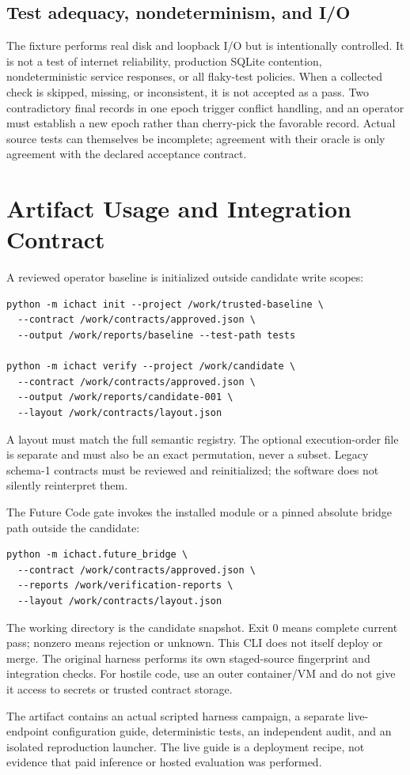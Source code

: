 \subsection{Test adequacy, nondeterminism, and I/O}
The fixture performs real disk and loopback I/O but is intentionally controlled. It is not a test of internet reliability, production SQLite contention, nondeterministic service responses, or all flaky-test policies. When a collected check is skipped, missing, or inconsistent, it is not accepted as a pass. Two contradictory final records in one epoch trigger conflict handling, and an operator must establish a new epoch rather than cherry-pick the favorable record. Actual source tests can themselves be incomplete; agreement with their oracle is only agreement with the declared acceptance contract.

\clearpage
\section{Artifact Usage and Integration Contract}
A reviewed operator baseline is initialized outside candidate write scopes:
\begin{verbatim}
python -m ichact init --project /work/trusted-baseline \
  --contract /work/contracts/approved.json \
  --output /work/reports/baseline --test-path tests

python -m ichact verify --project /work/candidate \
  --contract /work/contracts/approved.json \
  --output /work/reports/candidate-001 \
  --layout /work/contracts/layout.json
\end{verbatim}
A layout must match the full semantic registry. The optional execution-order file is separate and must also be an exact permutation, never a subset. Legacy schema-1 contracts must be reviewed and reinitialized; the software does not silently reinterpret them.

The Future Code gate invokes the installed module or a pinned absolute bridge path outside the candidate:
\begin{verbatim}
python -m ichact.future_bridge \
  --contract /work/contracts/approved.json \
  --reports /work/verification-reports \
  --layout /work/contracts/layout.json
\end{verbatim}
The working directory is the candidate snapshot. Exit 0 means complete current pass; nonzero means rejection or unknown. This CLI does not itself deploy or merge. The original harness performs its own staged-source fingerprint and integration checks. For hostile code, use an outer container/VM and do not give it access to secrets or trusted contract storage.

The artifact contains an actual scripted harness campaign, a separate live-endpoint configuration guide, deterministic tests, an independent audit, and an isolated reproduction launcher. The live guide is a deployment recipe, not evidence that paid inference or hosted evaluation was performed.
